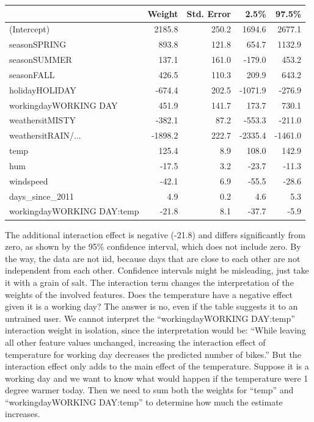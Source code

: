 \documentclass[
  10pt,
]{scrbook}
\begin{document}
\begin{table}
\centering
\begin{tabular}{>{\raggedright\arraybackslash}p{4.1cm}rrrr}
\toprule
  & Weight & Std. Error & 2.5\% & 97.5\%\\
\midrule
(Intercept) & 2185.8 & 250.2 & 1694.6 & 2677.1\\
seasonSPRING & 893.8 & 121.8 & 654.7 & 1132.9\\
seasonSUMMER & 137.1 & 161.0 & -179.0 & 453.2\\
seasonFALL & 426.5 & 110.3 & 209.9 & 643.2\\
holidayHOLIDAY & -674.4 & 202.5 & -1071.9 & -276.9\\
\addlinespace
workingdayWORKING DAY & 451.9 & 141.7 & 173.7 & 730.1\\
weathersitMISTY & -382.1 & 87.2 & -553.3 & -211.0\\
weathersitRAIN/... & -1898.2 & 222.7 & -2335.4 & -1461.0\\
temp & 125.4 & 8.9 & 108.0 & 142.9\\
hum & -17.5 & 3.2 & -23.7 & -11.3\\
\addlinespace
windspeed & -42.1 & 6.9 & -55.5 & -28.6\\
days\_since\_2011 & 4.9 & 0.2 & 4.6 & 5.3\\
workingdayWORKING DAY:temp & -21.8 & 8.1 & -37.7 & -5.9\\
\bottomrule
\end{tabular}
\end{table}

The additional interaction effect is negative (-21.8) and differs significantly from zero, as shown by the 95\% confidence interval, which does not include zero.
By the way, the data are not iid, because days that are close to each other are not independent from each other.
Confidence intervals might be misleading, just take it with a grain of salt.
The interaction term changes the interpretation of the weights of the involved features.
Does the temperature have a negative effect given it is a working day?
The answer is no, even if the table suggests it to an untrained user.
We cannot interpret the ``workingdayWORKING DAY:temp'' interaction weight in isolation, since the interpretation would be:
``While leaving all other feature values unchanged, increasing the interaction effect of temperature for working day decreases the predicted number of bikes.''
But the interaction effect only adds to the main effect of the temperature.
Suppose it is a working day and we want to know what would happen if the temperature were 1 degree warmer today.
Then we need to sum both the weights for ``temp'' and ``workingdayWORKING DAY:temp'' to determine how much the estimate increases.
\end{document}
